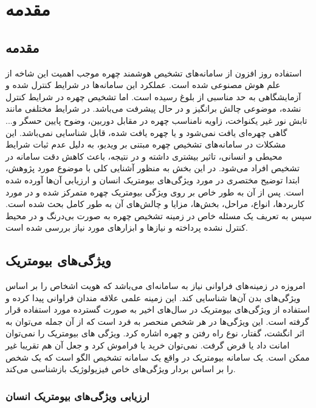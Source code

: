 \chapter{مقدمه}
\section{مقدمه}

استفاده روز افزون از سامانه‌های تشخیص هوشمند چهره موجب اهمیت این شاخه از علم هوش مصنوعی شده است. عملکرد این سامانه‌ها در شرایط کنترل شده و آزمایشگاهی به حد مناسبی از بلوغ رسیده است. اما تشخیص چهره در شرایط کنترل نشده، موضوعی چالش برانگیز و در حال پیشرفت می‌باشد. در شرایط مختلفی مانند تابش نور غیر یکنواخت، زاویه نامناسب چهره در مقابل دوربین، وضوح پایین حسگر و... گاهی چهره‌ای یافت نمی‌شود و یا چهره یافت شده، قابل شناسایی نمی‌باشد. این مشكلات در سامانه‌های تشخیص چهره مبتنی بر ویدیو، به دلیل عدم ثبات شرایط محیطی و انسانی، تاثیر بیشتری داشته و در نتیجه، باعث کاهش دقت سامانه در تشخیص افراد می‌شود.
در این بخش به منظور آشنایی کلی با موضوع مورد پژوهش، ابتدا توضیح مختصری در مورد ویژگی‌های بیومتریک انسان و ارزیابی آن‌ها آورده شده است. پس از آن به طور خاص بر روی ویژگی بیومتریک چهره متمرکز شده و در مورد کاربردها، انواع، مراحل، بخش‌ها، مزایا و چالش‌های آن به طور کامل بحث شده است. سپس به تعریف یک مسئله خاص در زمینه تشخیص چهره به صورت بی‌درنگ و در محیط کنترل نشده پرداخته و نیاز‌ها و ابزارهای مورد نیاز بررسی شده است.


\section{ویژگی‌های بیومتریک}

امروزه در زمینه‌های فراوانی نیاز به سامانه‌ای می‌باشد که هویت اشخاص را بر اساس ویژگی‌های بدن آن‌ها شناسایی کند. این زمینه علمی علاقه مندان فراوانی پیدا کرده و استفاده از ویژگی‌های بیومتریک  در سال‌های اخیر به صورت گسترده مورد استفاده قرار گرفته است. این ویژگی‌ها در هر شخص منحصر به فرد است که از آن جمله می‌توان به اثر انگشت، گفتار، نوع راه رفتن و چهره اشاره کرد. ویژگی های بیومتریک را نمی‌توان امانت داد یا قرض گرفت. نمی‌توان خرید یا فراموش کرد و جعل آن هم تقریبا غیر ممکن است. یک سامانه بیومتریک در واقع یک سامانه تشخیص الگو است که یک شخص را بر اساس بردار ویژگی‌های خاص فیزیولوژیک بازشناسی می‌کند. 

\subsection{ارزیابی ویژگی‌های بیومتریک انسان}

